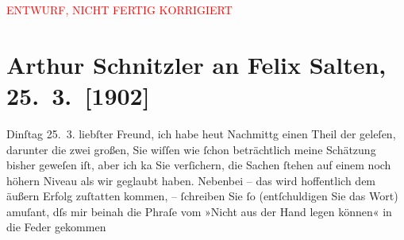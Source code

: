 
\begin{center}
            \textcolor{red}{ENTWURF, NICHT FERTIG KORRIGIERT}
                      \end{center}
            
         
         \renewcommand{\erwaehntePersonen}{Personen: Felix Salten, Arthur Strasser, Viktor Oskar Tilgner}
         \renewcommand{\erwaehnteOrte}{Orte: Wien}
         \renewcommand{\erwaehnteWerke}{Werke: Das Mozartdenkmal, Künstlerhaus, Moderne Rundschau, Secession. (Arthur Strasser), Victor Tilgner †, Wiener Allgemeine Zeitung}
               \section[Arthur Schnitzler an Felix Salten, 25. 3. {[}1902{]}]{ Arthur Schnitzler an Felix Salten, 25. 3. {[}1902{]}}\nopagebreak{}\rehead{ }\begin{ledgroupsized}[t]{13cm}\normalsize\beginnumbering \toendnotes[C]{\smallbreak\pagebreak[2]} 
\toendnotes[C]{\smallbreak}\pstart
           \raggedleft{}{\pb}Dinſtag 25. 3.\pend
           \pstart
           liebſter Freund, ich habe heut Nachmittg einen Theil der \label{K_L02972-4v}\label{K_L02972-4h} geleſen,
               darunter die zwei großen, Sie wiſſen wie \introOben{}ſchon\introOben{} beträchtlich
               meine Schätzung bisher geweſen iſt, aber ich ka{\geminationn} Sie
               verſichern, die Sachen ſtehen auf einem noch höhern Niveau als wir geglaubt haben.
               Nebenbei {\pb}– das wird hoffentlich dem äußern
               Erfolg zuſtatten kommen, – ſchreiben Sie ſo (entſchuldigen Sie das Wort) amuſant, dſs
               mir beinah die Phraſe vom »Nicht aus der Hand legen können« in die Feder gekommen

\end{ledgroupsized}
